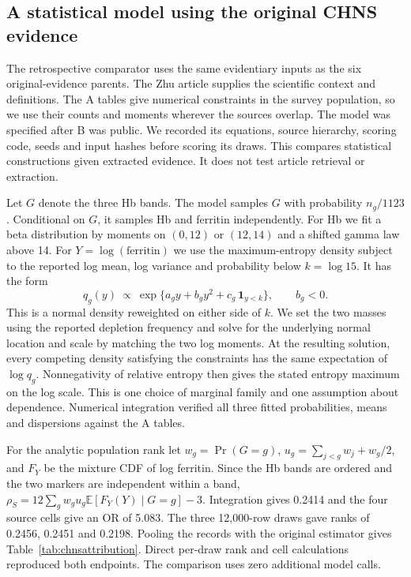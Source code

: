 \subsection{A statistical model using the original CHNS evidence}
\label{app:chnsstat}
The retrospective comparator uses the same evidentiary inputs as the six original-evidence parents. The Zhu article supplies the scientific context and definitions. The A tables give numerical constraints in the survey population, so we use their counts and moments wherever the sources overlap. The model was specified after B was public. We recorded its equations, source hierarchy, scoring code, seeds and input hashes before scoring its draws. This compares statistical constructions given extracted evidence. It does not test article retrieval or extraction.

Let $G$ denote the three Hb bands. The model samples $G$ with probability $n_g/1123$. Conditional on $G$, it samples Hb and ferritin independently. For Hb we fit a beta distribution by moments on $(0,12)$ or $(12,14)$ and a shifted gamma law above 14. For $Y=\log(\mathrm{ferritin})$ we use the maximum-entropy density subject to the reported log mean, log variance and probability below $k=\log 15$. It has the form
\[
q_g(y)\ \propto\ \exp\{a_g y+b_g y^2+c_g\,\mathbf{1}_{y<k}\},\qquad b_g<0 .
\]
This is a normal density reweighted on either side of $k$. We set the two masses using the reported depletion frequency and solve for the underlying normal location and scale by matching the two log moments. At the resulting solution, every competing density satisfying the constraints has the same expectation of $\log q_g$. Nonnegativity of relative entropy then gives the stated entropy maximum on the log scale. This is one choice of marginal family and one assumption about dependence. Numerical integration verified all three fitted probabilities, means and dispersions against the A tables.

For the analytic population rank let $w_g=\Pr(G=g)$, $u_g=\sum_{j<g}w_j+w_g/2$, and $F_Y$ be the mixture CDF of log ferritin. Since the Hb bands are ordered and the two markers are independent within a band, $\rho_S=12\sum_g w_g u_g \mathbb E[F_Y(Y)\mid G=g]-3$. Integration gives 0.2414 and the four source cells give an OR of 5.083. The three 12,000-row draws gave ranks of 0.2456, 0.2451 and 0.2198. Pooling the records with the original estimator gives Table~\ref{tab:chnsattribution}. Direct per-draw rank and cell calculations reproduced both endpoints. The comparison uses zero additional model calls.

